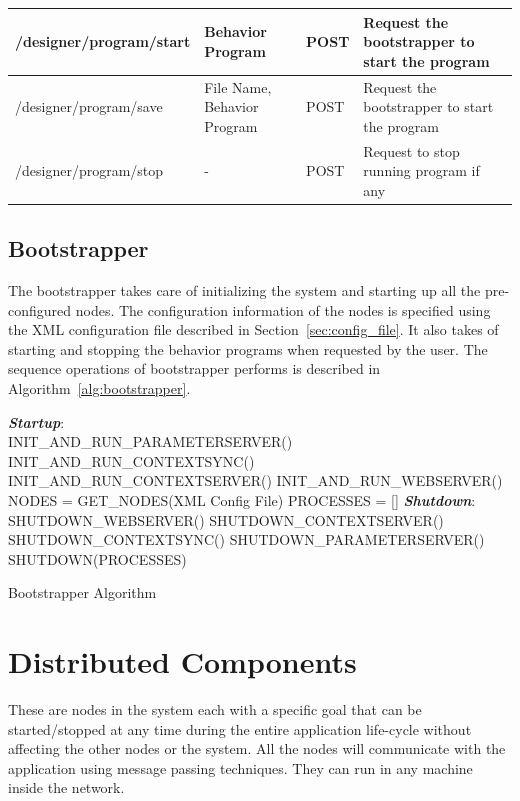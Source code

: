 \begin{table}[H]
\begin{tabular}{|l|p{2.8cm}|p{1.2cm}|p{5.5cm}|}
  /designer/program/start & Behavior Program & POST  & Request the bootstrapper to start the program
  										                    \tabularnewline\hline   

  /designer/program/save & File Name, Behavior Program & POST  & Request the bootstrapper to start the program
                                          \tabularnewline\hline 
  /designer/program/stop & - & POST  & Request to stop running program if any
                                          \tabularnewline\hline
\end{tabular}
\end{table}
\subsection*{Bootstrapper} 
The bootstrapper takes care of initializing the system and starting up all the pre-configured nodes. The configuration information of the nodes is specified using the XML configuration file described in Section~\ref{sec:config_file}. It also takes of starting and stopping the behavior programs when requested by the user. The sequence operations of bootstrapper performs is described in Algorithm~\ref{alg:bootstrapper}.

\begin{algorithm}[H]
 \textbf{\emph{Startup}}:\\
 \quad INIT\_AND\_RUN\_PARAMETERSERVER()\;
 \quad INIT\_AND\_RUN\_CONTEXTSYNC()\;
 \quad INIT\_AND\_RUN\_CONTEXTSERVER()\;
 \quad INIT\_AND\_RUN\_WEBSERVER()\;
 \quad NODES = GET\_NODES(XML Config File)\;
 \quad PROCESSES = []\;
 \textbf{\emph{Shutdown}}:\\
 \quad SHUTDOWN\_WEBSERVER()\; 
 \quad SHUTDOWN\_CONTEXTSERVER()\;
 \quad SHUTDOWN\_CONTEXTSYNC()\;
 \quad SHUTDOWN\_PARAMETERSERVER()\;
 \quad SHUTDOWN(PROCESSES)
 \caption{Bootstrapper Algorithm}
 \label{alg:bootstrapper}
\end{algorithm}
\section{Distributed Components}
\label{ssec:dist_comp}
These are nodes in the system each with a specific goal that can be started/stopped at any time during the entire application life-cycle without affecting the other nodes or the system. All the nodes will communicate with the application using message passing techniques. They can run in any machine inside the network.
